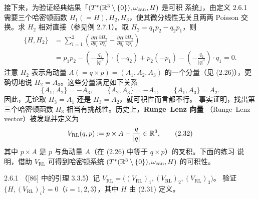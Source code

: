 接下来，为验证经典结果「$(T^*(\mathbb{R}^3\setminus\{0\}),\omega_{\mathrm{can}},H)$ 是可积
系统」，由定义 2.6.1 需要三个哈密顿函数 $H_1(=H),H_2,H_3$，使其微分线性无关且两两
Poisson 交换。求 $H_2$ 相对直接（参见例 2.7.1）。取 $H_2=q_1p_2-q_2p_1$，则
\begin{align*}
  \{H,H_2\}
  &=\sum_{i=1}^2\left(\frac{\partial H}{\partial p_i}\frac{\partial H_2}{\partial q_i}
    -\frac{\partial H}{\partial q_i}\frac{\partial H_2}{\partial p_i}\right)\\
  &=p_1p_2-\left(-\frac{q_1}{|q|^3}\right)\cdot(-q_2)+p_2(-p_1)
    -\left(-\frac{q_2}{|q|^3}\right)\cdot q_1=0 .
\end{align*}
注意 $H_2$ 表示角动量 $A(=q\times p)=(A_1,A_2,A_3)$ 的一个分量（见 (2.26)），更确切地说
$H_2=A_3$。这些分量满足如下关系
\[
  \{A_1,A_2\}=-A_3,\qquad
  \{A_2,A_3\}=-A_1,\qquad
  \{A_1,A_3\}=A_2 .
\]
因此，无论取 $H_3=A_1$ 还是 $H_3=A_2$，就可积性而言都不行。
事实证明，找出第三个哈密顿函数 $H_3$ 相当有挑战性。历史上，\textbf{Runge--Lenz 向量}
（Runge--Lenz vector）被发现并定义为
\begin{equation}
  V_{\mathrm{RL}}(q,p):=p\times A-\frac{q}{|q|}\in\mathbb{R}^3,
  \tag{2.32}
\end{equation}
其中 $p\times A$ 是 $p$ 与角动量 $A$（在 (2.26) 中等于 $q\times p$）的叉积。下面的练习
说明，借助 $V_{\mathrm{RL}}$ 可得到哈密顿系统 $(T^*(\mathbb{R}^3\setminus\{0\}),
\omega_{\mathrm{can}},H)$ 的可积性。

\begin{wexer}{2.6.1}
（[86] 中的引理 3.3.5）记
$V_{\mathrm{RL}}=\big((V_{\mathrm{RL}})_1,(V_{\mathrm{RL}})_2,(V_{\mathrm{RL}})_3\big)$。
验证 $\{H,(V_{\mathrm{RL}})_i\}=0$（$i=1,2,3$），其中 $H$ 由 (2.31) 定义。
\end{wexer}

